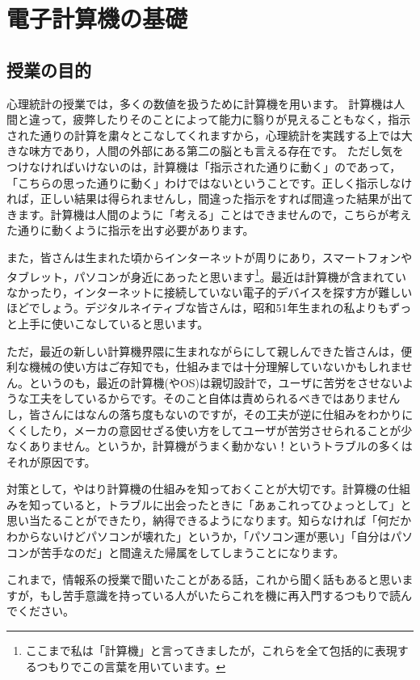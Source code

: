 \documentclass{ltjsbook}
\begin{document}
\chapter{電子計算機の基礎}
\label{computer}

\section{授業の目的}
心理統計の授業では，多くの数値を扱うために計算機を用います。
計算機は人間と違って，疲弊したりそのことによって能力に翳りが見えることもなく，指示された通りの計算を粛々とこなしてくれますから，心理統計を実践する上では大きな味方であり，人間の外部にある第二の脳とも言える存在です。
ただし気をつけなければいけないのは，計算機は「指示された通りに動く」のであって，「こちらの思った通りに動く」わけではないということです。正しく指示しなければ，正しい結果は得られませんし，間違った指示をすれば間違った結果が出てきます。計算機は人間のように「考える」ことはできませんので，こちらが考えた通りに動くように指示を出す必要があります。

また，皆さんは生まれた頃からインターネットが周りにあり，スマートフォンやタブレット，パソコンが身近にあったと思います\footnote{ここまで私は「計算機」と言ってきましたが，これらを全て包括的に表現するつもりでこの言葉を用いています。}。最近は計算機が含まれていなかったり，インターネットに接続していない電子的デバイスを探す方が難しいほどでしょう。デジタルネイティブな皆さんは，昭和51年生まれの私よりもずっと上手に使いこなしていると思います。

ただ，最近の新しい計算機界隈に生まれながらにして親しんできた皆さんは，便利な機械の使い方はご存知でも，仕組みまでは十分理解していないかもしれません。というのも，最近の計算機(やOS)は親切設計で，ユーザに苦労をさせないような工夫をしているからです。そのこと自体は責められるべきではありませんし，皆さんにはなんの落ち度もないのですが，その工夫が逆に仕組みをわかりにくくしたり，メーカの意図せざる使い方をしてユーザが苦労させられることが少なくありません。というか，計算機がうまく動かない！というトラブルの多くはそれが原因です。

対策として，やはり計算機の仕組みを知っておくことが大切です。計算機の仕組みを知っていると，トラブルに出会ったときに「あぁこれってひょっとして」と思い当たることができたり，納得できるようになります。知らなければ「何だかわからないけどパソコンが壊れた」というか，「パソコン運が悪い」「自分はパソコンが苦手なのだ」と間違えた帰属をしてしまうことになります。

これまで，情報系の授業で聞いたことがある話，これから聞く話もあると思いますが，もし苦手意識を持っている人がいたらこれを機に再入門するつもりで読んでください。
\end{document}

